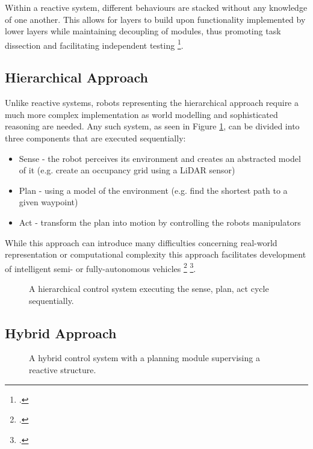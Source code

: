 Within a reactive system, different behaviours are stacked without any knowledge of one another. This allows for layers to build upon functionality implemented by lower layers while maintaining decoupling of modules, thus promoting task dissection and facilitating independent testing \footcite{faigl2017controlParadigms}.


\subsection{Hierarchical Approach}
Unlike reactive systems, robots representing the hierarchical approach require a much more complex implementation as world modelling and sophisticated reasoning are needed. 
Any such system, as seen in Figure \ref{fig:hierarchicalApproach}, can be divided into three components that are executed sequentially:
\begin{itemize}
	\item Sense - the robot perceives its environment and creates an abstracted model of it (e.g. create an occupancy grid using a LiDAR sensor)
	\item Plan - using a model of the environment (e.g. find the shortest path to a given waypoint)
	\item Act - transform the plan into motion by controlling the robots manipulators
\end{itemize}

While this approach can introduce many difficulties concerning real-world representation or computational complexity this approach facilitates development of intelligent semi- or fully-autonomous vehicles \footcite{faigl2017controlParadigms} \footcite{burgard2020controlParadigms}.

\begin{figure}
	\centering
	
	\caption{
		A hierarchical control system executing the sense, plan, act cycle sequentially.
	}
	\label{fig:hierarchicalApproach}
\end{figure}

\subsection{Hybrid Approach}

\begin{figure}
	\centering
	
	\caption{
		A hybrid control system with a planning module supervising a reactive structure. 
	}
	\label{fig:hybridApproach}
\end{figure}


